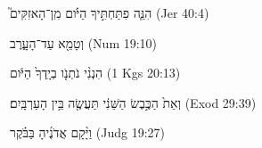 
\begin{exe}

\ex\label{ex_def_time1}
\texthebrew{
הִנֵּ֧ה פִתַּחְתִּ֣יךָ הַיֹּ֗ום מִֽן־הָאזִקִּים֮ 
} (Jer 40:4)

\ex\label{ex_def_time2}
\texthebrew{
וְטָמֵ֖א עַד־הָעָ֑רֶב 
} (Num 19:10)

\ex\label{ex_def_time3}
\texthebrew{
הִנְנִ֨י נֹתְנֹ֤ו בְיָֽדְךָ֙ הַיֹּ֔ום 
} (1 Kgs 20:13)

\ex\label{ex_def_time4}
\texthebrew{
וְאֵת֙ הַכֶּ֣בֶשׂ הַשֵּׁנִ֔י תַּעֲשֶׂ֖ה בֵּ֥ין הָעַרְבָּֽיִם׃ 
} (Exod 29:39)

\ex\label{ex_def_time5}
\texthebrew{
וַיָּ֨קָם אֲדֹנֶ֜יהָ בַּבֹּ֗קֶר 
} (Judg 19:27)

\end{exe}
